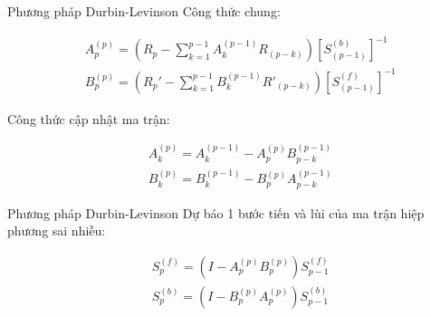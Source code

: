\begin{frame}{Phương pháp  Durbin-Levinson}
    Công thức chung:

\begin{align}
    & A_p^{(p)} = (R_p - \sum_{k=1}^{p-1} A_k^{(p-1)} R_{(p-k)} ) \left[ S_{(p-1)}^{(b)}\right]^{-1} \\
    & B_p^{(p)} = (R_p' - \sum_{k=1}^{p-1} B_k^{(p-1)} R'_{(p-k)} ) \left[ S_{(p-1)}^{(f)}\right]^{-1}
\end{align}

Công thức cập nhật ma trận:

\begin{align}
    & A_k^{(p)} = A_k^{(p-1)} - A_p^{(p)} B_{p-k}^{(p-1)} \\
     & B_k^{(p)} = B_k^{(p-1)} - B_p^{(p)} A_{p-k}^{(p-1)}
\end{align}
\end{frame}

\begin{frame}{Phương pháp  Durbin-Levinson}
    Dự báo 1 bước tiến và lùi của ma trận hiệp phương sai nhiễu:

\begin{align}
    & S_p^{(f)} = (I - A_p^{(p)} B_p^(p)) S_{p-1} ^{(f)} \\
    & S_p^{(b)} = (I - B_p^{(p)} A_p^(p)) S_{p-1} ^{(b)}
\end{align}
\end{frame}


